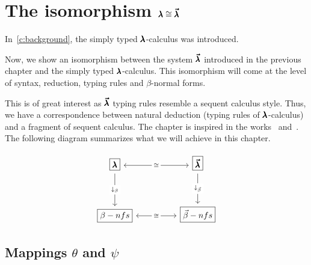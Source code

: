 \chapter{The isomorphism $\pmb{\lambda} \cong \pmb{\vec \lambda}$}
\label{c:isomorphism}
In~\cref{c:background}, the simply typed $\pmb{\lambda}$-calculus was introduced.

Now, we show an isomorphism between the system $\pmb{\vec \lambda}$ introduced in the previous chapter and the simply typed $\pmb{\lambda}$-calculus.
This isomorphism will come at the level of syntax, reduction, typing rules and $\beta$-normal forms.

This is of great interest as $\pmb{\vec \lambda}$ typing rules resemble a sequent calculus style.
Thus, we have a correspondence between natural deduction (typing rules of $\pmb{\lambda}$-calculus) and a fragment of sequent calculus.
The chapter is inspired in the works~\cite{LuisDychkoff} and~\cite[Chapter~4]{JCES2002}.
The following diagram summarizes what we will achieve in this chapter.

\[
  \begin{tikzcd}
    {\boxed \Lam} && {\boxed \LamV} \\
    \\
    {\boxed{\small{\beta-nfs}}} && {\boxed{\small{\vec \beta-nfs}}}
    \arrow["\cong"{description}, <->, from=1-1, to=1-3]
    \arrow["{\downarrow_\beta}"{description}, from=1-1, to=3-1]
    \arrow["{\downarrow_{\vec \beta}}"{description}, from=1-3, to=3-3]
    \arrow["\cong"{description}, <->, from=3-1, to=3-3]
  \end{tikzcd}
\]

\section{Mappings $\theta$ and $\psi$}

